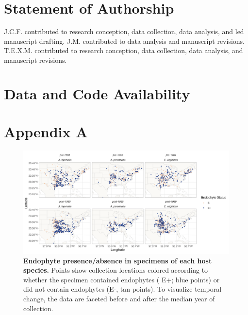 \documentclass[11pt]{article}
\begin{document}
	
	\section*{Statement of Authorship}
J.C.F. contributed to research conception, data collection, data analysis, and led manuscript drafting.
J.M. contributed to data analysis and manuscript revisions.
T.E.X.M. contributed to research conception, data collection, data analysis, and manuscript revisions.

	
	\section*{Data and Code Availability}
\newpage{}
	
	
	
\newpage{}


	\section*{Appendix A}
	\renewcommand{\thefigure}{A\arabic{figure}}
	\setcounter{figure}{0}
	
		\renewcommand{\thetable}{A\arabic{table}}
	\setcounter{equation}{0}  %
	\setcounter{figure}{0}
	\setcounter{table}{0}
	
	\begin{figure}[H]
		\centering
		\includegraphics[width = \linewidth]{../Plots/endo_status_map.png}
		\caption{\textbf{Endophyte presence/absence in specimens of each host species.} Points show collection locations colored according to whether the specimen contained endophytes ( E+; blue points) or did not contain endophytes (E-, tan points). To visualize temporal change, the data are faceted before and after the median year of collection.}
		\label{fig:endo_status_map}
	\end{figure}
	
\end{document}
